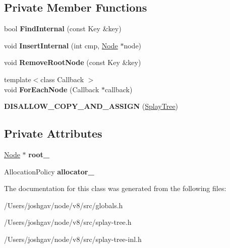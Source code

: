 \subsection*{Private Member Functions}
\begin{DoxyCompactItemize}
\item 
bool {\bfseries Find\+Internal} (const Key \&key)\hypertarget{classv8_1_1internal_1_1_splay_tree_a313410f77895f4bf107e930bb936c941}{}\label{classv8_1_1internal_1_1_splay_tree_a313410f77895f4bf107e930bb936c941}

\item 
void {\bfseries Insert\+Internal} (int cmp, \hyperlink{classv8_1_1internal_1_1_splay_tree_1_1_node}{Node} $\ast$node)\hypertarget{classv8_1_1internal_1_1_splay_tree_aae6153349daaf24760573a629f8e5052}{}\label{classv8_1_1internal_1_1_splay_tree_aae6153349daaf24760573a629f8e5052}

\item 
void {\bfseries Remove\+Root\+Node} (const Key \&key)\hypertarget{classv8_1_1internal_1_1_splay_tree_a814e3c768b73e075636956034b314dd1}{}\label{classv8_1_1internal_1_1_splay_tree_a814e3c768b73e075636956034b314dd1}

\item 
{\footnotesize template$<$class Callback $>$ }\\void {\bfseries For\+Each\+Node} (Callback $\ast$callback)\hypertarget{classv8_1_1internal_1_1_splay_tree_ae65e42daa9a4871537279c121b624231}{}\label{classv8_1_1internal_1_1_splay_tree_ae65e42daa9a4871537279c121b624231}

\item 
{\bfseries D\+I\+S\+A\+L\+L\+O\+W\+\_\+\+C\+O\+P\+Y\+\_\+\+A\+N\+D\+\_\+\+A\+S\+S\+I\+GN} (\hyperlink{classv8_1_1internal_1_1_splay_tree}{Splay\+Tree})\hypertarget{classv8_1_1internal_1_1_splay_tree_acdd3835919ca3d49d8e955aaeacd272c}{}\label{classv8_1_1internal_1_1_splay_tree_acdd3835919ca3d49d8e955aaeacd272c}

\end{DoxyCompactItemize}
\subsection*{Private Attributes}
\begin{DoxyCompactItemize}
\item 
\hyperlink{classv8_1_1internal_1_1_splay_tree_1_1_node}{Node} $\ast$ {\bfseries root\+\_\+}\hypertarget{classv8_1_1internal_1_1_splay_tree_ada1613481d35ec351120be78d11eeadb}{}\label{classv8_1_1internal_1_1_splay_tree_ada1613481d35ec351120be78d11eeadb}

\item 
Allocation\+Policy {\bfseries allocator\+\_\+}\hypertarget{classv8_1_1internal_1_1_splay_tree_a8094e2d5c568af1bbd77be6eaca42a10}{}\label{classv8_1_1internal_1_1_splay_tree_a8094e2d5c568af1bbd77be6eaca42a10}

\end{DoxyCompactItemize}


The documentation for this class was generated from the following files\+:\begin{DoxyCompactItemize}
\item 
/\+Users/joshgav/node/v8/src/globals.\+h\item 
/\+Users/joshgav/node/v8/src/splay-\/tree.\+h\item 
/\+Users/joshgav/node/v8/src/splay-\/tree-\/inl.\+h\end{DoxyCompactItemize}
